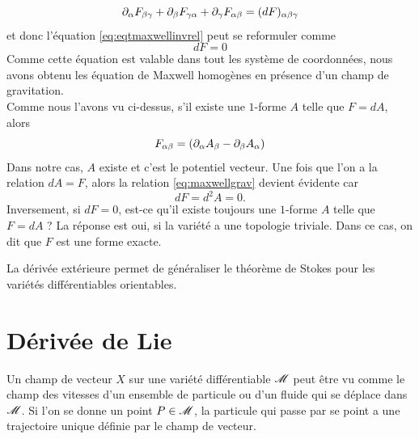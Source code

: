 \documentclass[a4paper,11pt]{report}
\begin{document}
\begin{exmp}
                \begin{equation}
                    \partial_\alpha F_{\beta\gamma}+\partial_\beta F_{\gamma\alpha}+\partial_\gamma F_{\alpha\beta} = (dF)_{\alpha\beta\gamma}
                \end{equation}
                et donc l'équation \ref{eq:eqtmaxwellinvrel} peut se reformuler comme
                \begin{equation}\label{eq:maxwellgrav}
                    dF = 0
                \end{equation}
                Comme cette équation est valable dans tout les système de coordonnées, nous avons obtenu les équation de Maxwell homogènes en présence d'un champ de gravitation.\\
                
                Comme nous l'avons vu ci-dessus, s'il existe une $1$-forme $A$ telle que $F = dA$, alors
                \begin{equation}
                    F_{\alpha\beta} = (\partial_\alpha A_\beta-\partial_\beta A_\alpha)
                \end{equation}
                Dans notre cas, $A$ existe et c'est le potentiel vecteur. Une fois que l'on a la relation $dA = F$, alors la relation \ref{eq:maxwellgrav} devient évidente car
                \begin{equation}
                    dF = d^2A = 0.
                \end{equation}
                Inversement, si $dF = 0$, est-ce qu'il existe toujours une $1$-forme $A$ telle que $F = dA$ ? La réponse est oui, si la variété a une topologie triviale. Dans ce cas, on dit que $F$ est une forme exacte.
            \end{exmp}
            
            La dérivée extérieure permet de généraliser le théorème de Stokes pour les variétés différentiables orientables.
            
        \section{Dérivée de Lie}
            
            Un champ de vecteur $X$ sur une variété différentiable $\mathscr{M}$ peut être vu comme le champ des vitesses d'un ensemble de particule ou d'un fluide qui se déplace dans $\mathscr{M}$. Si l'on se donne un point $P\in\mathscr{M}$, la particule qui passe par se point a une trajectoire unique définie par le champ de vecteur.
            
\end{document}
